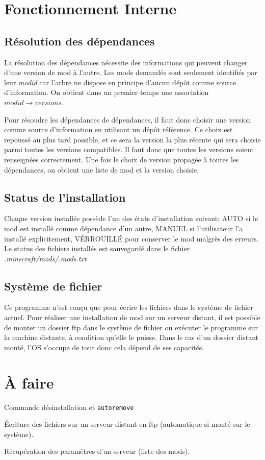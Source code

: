 \documentclass{article}
\begin{document}
%
%
\section{Fonctionnement Interne}
\subsection{Résolution des dépendances}
La résolution des dépendances nécessite des informations qui peuvent changer d'une version de mod à l'autre.
Les mods demandés sont seulement identifiés par leur \textit{modid} car l'arbre ne dispose en principe d'aucun dépôt comme source d'information.
On obtient dans un premier temps une association $modid \rightarrow versions$.

Pour résoudre les dépendances de dépendances, il faut donc choisir une version comme source d'information en utilisant un dépôt référence.
Ce choix est repoussé au plus tard possible, et ce sera la version la plus récente qui sera choisie parmi toutes les versions compatibles.
Il faut donc que toutes les versions soient renseignées correctement.
Une fois le choix de version propagée à toutes les dépendances, on obtient une liste de mod et la version choisie.

\subsection{Status de l'installation}
Chaque version installée possède l'un des états d'installation suivant: AUTO si le mod est installé comme dépendance d'un autre, MANUEL si l'utilisateur l'a installé explicitement, VÉRROUILLÉ pour conserver le mod malgrès des erreurs.
Le status des fichiers installés est sauvegardé dans le fichier \textit{.minecraft/mods/.mods.txt}

\subsection{Système de fichier}
Ce programme n'est conçu que pour écrire les fichiers dans le système de fichier actuel.
Pour réaliser une installation de mod sur un serveur distant, il est possible de monter un dossier ftp dans le système de fichier ou exécuter le programme sur la machine distante, à condition qu'elle le puisse.
Dans le cas d'un dossier distant monté, l'OS s'occupe de tout donc cela dépend de ses capacités.

\newpage
\section{À faire}
Commande désinstallation et \texttt{autoremove}

Écriture des fichiers sur un serveur distant en ftp (automatique si monté sur le système).

Récupération des paramètres d'un serveur (liste des mods).
	
\end{document}
